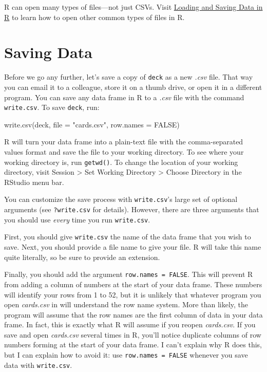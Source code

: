 \documentclass[
  letterpaper,
  DIV=11,
  numbers=noendperiod]{scrbook}
\newenvironment{Shaded}{\begin{snugshade}}{\end{snugshade}}
\newcommand{\AttributeTok}[1]{\textcolor[rgb]{0.40,0.45,0.13}{#1}}
\newcommand{\ConstantTok}[1]{\textcolor[rgb]{0.56,0.35,0.01}{#1}}
\newcommand{\FunctionTok}[1]{\textcolor[rgb]{0.28,0.35,0.67}{#1}}
\newcommand{\NormalTok}[1]{\textcolor[rgb]{0.00,0.23,0.31}{#1}}
\newcommand{\StringTok}[1]{\textcolor[rgb]{0.13,0.47,0.30}{#1}}
\begin{document}
R can open many types of files---not just CSVs. Visit
\hyperref[sec-appendix-dataio]{Loading and Saving Data in R} to learn
how to open other common types of files in R.

\section{Saving Data}\label{saving-data}

Before we go any further, let's save a copy of \texttt{deck} as a new
\emph{.csv} file. That way you can email it to a colleague, store it on
a thumb drive, or open it in a different program. You can save any data
frame in R to a \emph{.csv} file with the command \texttt{write.csv}. To
save \texttt{deck}, run:

\begin{Shaded}
\begin{Highlighting}[]
\FunctionTok{write.csv}\NormalTok{(deck, }\AttributeTok{file =} \StringTok{"cards.csv"}\NormalTok{, }\AttributeTok{row.names =} \ConstantTok{FALSE}\NormalTok{)}
\end{Highlighting}
\end{Shaded}

R will turn your data frame into a plain-text file with the
comma-separated values format and save the file to your working
directory. To see where your working directory is, run \texttt{getwd()}.
To change the location of your working directory, visit Session
\textgreater{} Set Working Directory \textgreater{} Choose Directory in
the RStudio menu bar.

You can customize the save process with \texttt{write.csv}'s large set
of optional arguments (see \texttt{?write.csv} for details). However,
there are three arguments that you should use \emph{every} time you run
\texttt{write.csv}.

First, you should give \texttt{write.csv} the name of the data frame
that you wish to save. Next, you should provide a file name to give your
file. R will take this name quite literally, so be sure to provide an
extension.

Finally, you should add the argument \texttt{row.names\ =\ FALSE}. This
will prevent R from adding a column of numbers at the start of your data
frame. These numbers will identify your rows from 1 to 52, but it is
unlikely that whatever program you open \emph{cards.csv} in will
understand the row name system. More than likely, the program will
assume that the row names are the first column of data in your data
frame. In fact, this is exactly what R will assume if you reopen
\emph{cards.csv}. If you save and open \emph{cards.csv} several times in
R, you'll notice duplicate columns of row numbers forming at the start
of your data frame. I can't explain why R does this, but I can explain
how to avoid it: use \texttt{row.names\ =\ FALSE} whenever you save data
with \texttt{write.csv}.
\end{document}
